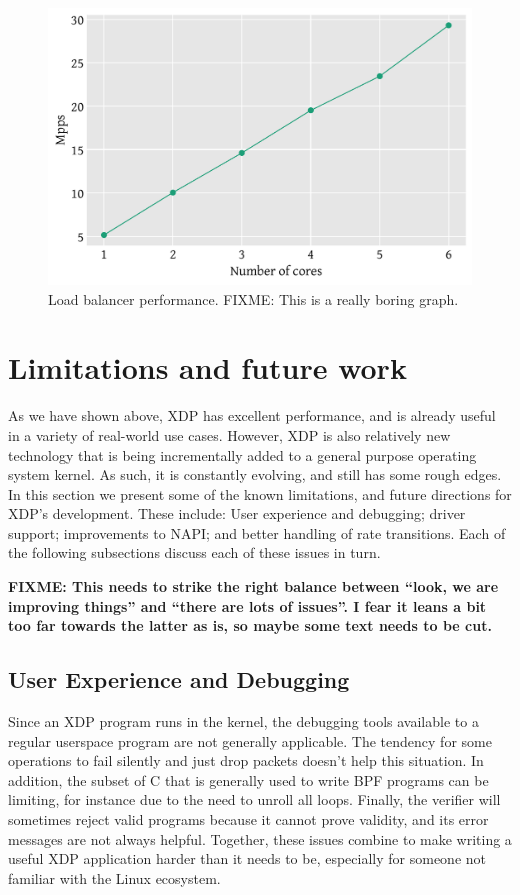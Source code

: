 \documentclass[10pt,sigconf]{acmart}
\begin{document}
\begin{figure}[t]
\centering
\includegraphics[width=\linewidth]{figures/load-balancer.pdf}
\caption{\label{fig:load-balancer} Load balancer performance. FIXME: This is a
  really boring graph.}
\end{figure}


\section{Limitations and future work}
\label{sec:limitations}
As we have shown above, XDP has excellent performance, and is already useful in
a variety of real-world use cases. However, XDP is also relatively new
technology that is being incrementally added to a general purpose operating
system kernel. As such, it is constantly evolving, and still has some rough
edges. In this section we present some of the known limitations, and future
directions for XDP's development. These include: User experience and debugging;
driver support; improvements to NAPI; and better handling of rate transitions.
Each of the following subsections discuss each of these issues in turn.

\textbf{FIXME: This needs to strike the right balance between ``look, we are
  improving things'' and ``there are lots of issues''. I fear it leans a bit too
far towards the latter as is, so maybe some text needs to be cut.}

\subsection{User Experience and Debugging}
\label{sec:user-exper-debugg}
Since an XDP program runs in the kernel, the debugging tools available to a
regular userspace program are not generally applicable. The tendency for some
operations to fail silently and just drop packets doesn't help this situation.
In addition, the subset of C that is generally used to write BPF programs can be
limiting, for instance due to the need to unroll all loops. Finally, the
verifier will sometimes reject valid programs because it cannot prove validity,
and its error messages are not always helpful. Together, these issues combine to
make writing a useful XDP application harder than it needs to be, especially for
someone not familiar with the Linux ecosystem.
\end{document}

